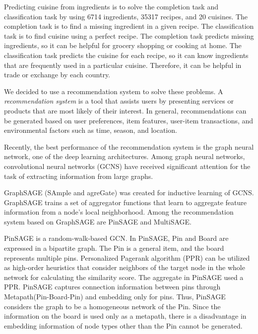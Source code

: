 Predicting cuisine from ingredients is to solve the completion task and classification task by using 6714 ingredients, 35317 recipes, and 20 cuisines.
The completion task is to find a missing ingredient in a given recipe.
The classification task is to find cuisine using a perfect recipe.
The completion task predicts missing ingredients, so it can be helpful for grocery shopping or cooking at home.
The classification task predicts the cuisine for each recipe, so it can know ingredients that are frequently used in a particular cuisine.
Therefore, it can be helpful in trade or exchange by each country.

We decided to use a recommendation system to solve these problems.
A \emph{recommendation system} is a tool that assists users by presenting services or products that are most likely of their interest.
In general, recommendations can be generated based on user preferences, item features, user-item transactions, and environmental factors such as time, season, and location\cite{da2020recommendation}.

Recently, the best performance of the recommendation system is the graph neural network, one of the deep learning architectures.
Among graph neural networks, convolutional neural networks (GCNS) have received significant attention for the task of extracting information from large graphs\cite{chen2018fastgcn}.

GraphSAGE (SAmple and agreGate)\cite{hamilton2017inductive} was created for inductive learning of GCNS.
GraphSAGE trains a set of aggregator functions that learn to aggregate feature information from a node's local neighborhood.
Among the recommendation system based on GraphSAGE are PinSAGE and  MultiSAGE.

PinSAGE\cite{ying2018graph} is a random-walk-based GCN. In PinSAGE, Pin and Board are expressed in a bipartite graph.
The Pin is a general item, and the board represents multiple pins.
Personalized Pagerank algorithm (PPR)\cite{bahmani2010fast} can be utilized as high-order heuristics that consider neighbors of the target node in the whole network for calculating the similarity score.
The aggregate in PinSAGE used a PPR.
PinSAGE captures connection information between pins through Metapath(Pin-Board-Pin) and embedding only for pins.
Thus, PinSAGE considers the graph to be a homogeneous network of the Pin.
Since the information on the board is used only as a metapath, there is a disadvantage in embedding information of node types other than the Pin cannot be generated.

